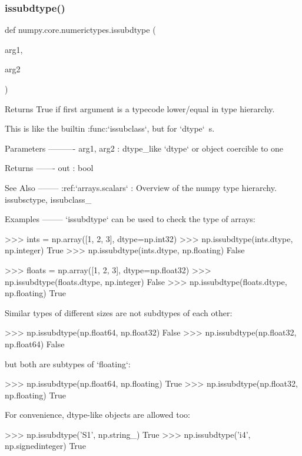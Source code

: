 \subsubsection{\texorpdfstring{issubdtype()}{issubdtype()}}
{\footnotesize\ttfamily def numpy.\+core.\+numerictypes.\+issubdtype (\begin{DoxyParamCaption}\item[{}]{arg1,  }\item[{}]{arg2 }\end{DoxyParamCaption})}

\begin{DoxyVerb}Returns True if first argument is a typecode lower/equal in type hierarchy.

This is like the builtin :func:`issubclass`, but for `dtype`\ s.

Parameters
----------
arg1, arg2 : dtype_like
    `dtype` or object coercible to one

Returns
-------
out : bool

See Also
--------
:ref:`arrays.scalars` : Overview of the numpy type hierarchy.
issubsctype, issubclass_

Examples
--------
`issubdtype` can be used to check the type of arrays:

>>> ints = np.array([1, 2, 3], dtype=np.int32)
>>> np.issubdtype(ints.dtype, np.integer)
True
>>> np.issubdtype(ints.dtype, np.floating)
False

>>> floats = np.array([1, 2, 3], dtype=np.float32)
>>> np.issubdtype(floats.dtype, np.integer)
False
>>> np.issubdtype(floats.dtype, np.floating)
True

Similar types of different sizes are not subdtypes of each other:

>>> np.issubdtype(np.float64, np.float32)
False
>>> np.issubdtype(np.float32, np.float64)
False

but both are subtypes of `floating`:

>>> np.issubdtype(np.float64, np.floating)
True
>>> np.issubdtype(np.float32, np.floating)
True

For convenience, dtype-like objects are allowed too:

>>> np.issubdtype('S1', np.string_)
True
>>> np.issubdtype('i4', np.signedinteger)
True\end{DoxyVerb}
 \mbox{\label{namespacenumpy_1_1core_1_1numerictypes_a248957fb69c8b2fee6ecc1ef38266c88}} 
